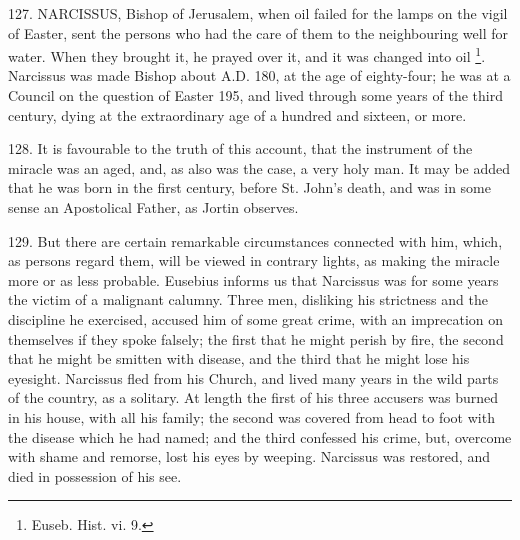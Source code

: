 
127.
NARCISSUS, Bishop of Jerusalem,
when oil failed for the lamps on the vigil of Easter, sent the persons
who had the care of them to the neighbouring well for water. When they
brought it, he prayed over it, and it was changed into oil \footnote{Euseb. Hist. vi. 9.}. Narcissus was made Bishop about A.D.
180, at the age of eighty-four; he was at a Council on the question of
Easter 195, and lived through some years of the third century, dying
at the extraordinary age of a hundred and sixteen, or more.

128.
It is favourable to the truth of this account, that the instrument of
the miracle was an aged, and, as also was the case, a very holy man.
It may be added that he was born in the first century, before St. John's
death, and was in some sense an Apostolical Father, as Jortin
observes.

129.
But there are certain remarkable circumstances connected with him,
which, as persons regard them, will be viewed in contrary
lights, as making the miracle more or as less probable. Eusebius
informs us that Narcissus was for some years the victim of a malignant
calumny. Three men, disliking his strictness and the discipline he
exercised, accused him of some great crime, with an imprecation on
themselves if they spoke falsely; the first that he might perish by
fire, the second that he might be smitten with disease, and the third
that he might lose his eyesight. Narcissus fled from his Church, and
lived many years in the wild parts of the country, as a solitary. At
length the first of his three accusers was burned in his house, with
all his family; the second was covered from head to foot with the
disease which he had named; and the third confessed his crime, but,
overcome with shame and remorse, lost his eyes by weeping. Narcissus
was restored, and died in possession of his see.

